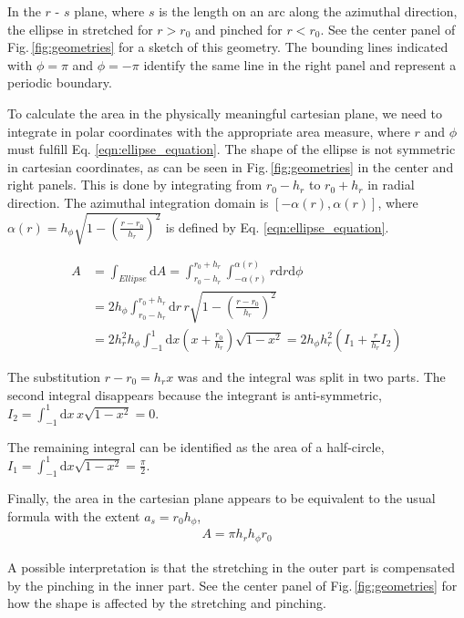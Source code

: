 \documentclass[a4paper]{scrartcl}
\begin{document}
In the $r$ - $s$ plane, where $s$ is the length on an arc along the azimuthal direction,
the ellipse in stretched for $r > r_0$ and pinched for $r < r_0$.
See the center panel of Fig.\,\ref{fig:geometries} for a sketch of this geometry.
The bounding lines indicated with $\phi=\pi$ and $\phi=-\pi$ identify the same line in the right panel
and represent a periodic boundary.

To calculate the area in the physically meaningful cartesian plane, 
we need to integrate in polar coordinates with the appropriate area measure,
where $r$ and $\phi$ must fulfill Eq. \eqref{eqn:ellipse_equation}.
The shape of the ellipse is not symmetric in cartesian coordinates, 
as can be seen in Fig.\,\ref{fig:geometries} in the center and right panels.
This is done by integrating from $r_0 - h_r$ to $r_0 + h_r$ in radial direction.
The azimuthal integration domain is $[-\alpha(r), \alpha(r)]$, where
$\alpha(r) = h_\phi \sqrt{1 - \left(\frac{r-r_0}{h_r}\right)^2}$ is defined by Eq. \eqref{eqn:ellipse_equation}.


\begin{align}
  A & = \int_{Ellipse} \mathrm{d}A
  = \int_{r_0 - h_r}^{r_0 + h_r} \int_{-\alpha(r)}^{\alpha(r)} r \mathrm{d}r \mathrm{d}\phi                \\
    & = 2 h_\phi \int_{r_0 - h_r}^{r_0 + h_r} \mathrm{d}r \, r \sqrt{1 - \left(\frac{r-r_0}{h_r}\right)^2} \\
    & = 2 h_r^2 h_\phi \int_{-1}^1 \mathrm{d}x \left(x + \frac{r_0}{h_r}\right) \sqrt{1-x^2}
  = 2 h_\phi h_r^2 \left( I_1 + \frac{r}{h_r} I_2 \right)
\end{align}

The substitution $r - r_0 = h_r x$ was and the integral was split in two parts.
The second integral disappears because the integrant is anti-symmetric, 
$  I_2 = \int_{-1}^{1} \mathrm{d} x\, x \sqrt{1 - x^2} = 0$.

The remaining integral can be identified as the area of a half-circle,
$I_1 = \int_{-1}^1 \mathrm{d} x \sqrt{1 - x^2} = \frac{\pi}{2}$.

Finally, the area in the cartesian plane appears to be equivalent to the usual formula with the extent $a_s = r_0 h_\phi$,
\begin{align}
  A = \pi h_r h_\phi r_0
\end{align}

A possible interpretation is that the stretching in the outer part is compensated by the pinching in the inner part.
See the center panel of Fig.\,\ref{fig:geometries} for how the shape is affected by the stretching and pinching.
\end{document}
